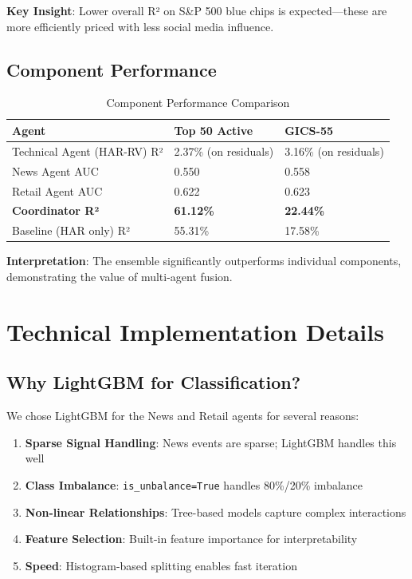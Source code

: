 \documentclass[12pt,a4paper]{article}
\begin{document}
\textbf{Key Insight}: Lower overall R² on S\&P 500 blue chips is expected—these are more efficiently priced with less social media influence.

\subsection{Component Performance}

\begin{table}[H]
\centering
\begin{tabular}{lll}
\toprule
\textbf{Agent} & \textbf{Top 50 Active} & \textbf{GICS-55} \\
\midrule
Technical Agent (HAR-RV) R² & 2.37\% (on residuals) & 3.16\% (on residuals) \\
News Agent AUC & 0.550 & 0.558 \\
Retail Agent AUC & 0.622 & 0.623 \\
\textbf{Coordinator R²} & \textbf{61.12\%} & \textbf{22.44\%} \\
Baseline (HAR only) R² & 55.31\% & 17.58\% \\
\bottomrule
\end{tabular}
\caption{Component Performance Comparison}
\label{tab:component_perf}
\end{table}

\textbf{Interpretation}: The ensemble significantly outperforms individual components, demonstrating the value of multi-agent fusion.

\section{Technical Implementation Details}

\subsection{Why LightGBM for Classification?}

We chose LightGBM for the News and Retail agents for several reasons:

\begin{enumerate}
    \item \textbf{Sparse Signal Handling}: News events are sparse; LightGBM handles this well
    \item \textbf{Class Imbalance}: \texttt{is\_unbalance=True} handles 80\%/20\% imbalance
    \item \textbf{Non-linear Relationships}: Tree-based models capture complex interactions
    \item \textbf{Feature Selection}: Built-in feature importance for interpretability
    \item \textbf{Speed}: Histogram-based splitting enables fast iteration
\end{enumerate}
\end{document}
